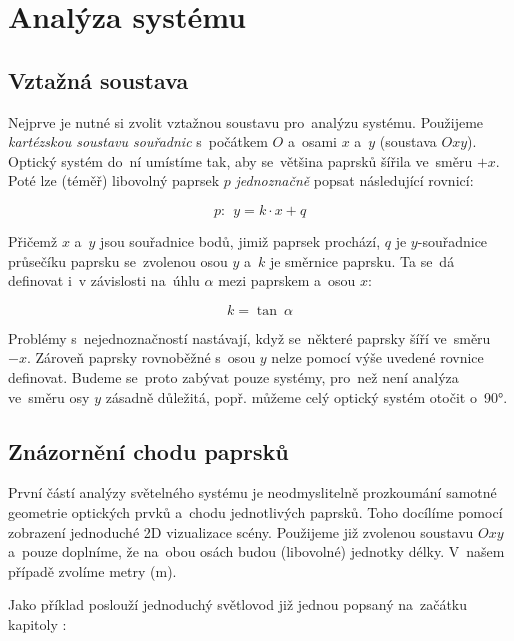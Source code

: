 \section{Analýza systému}
\label{sec:analyzasystemu}

\subsection{Vztažná soustava}

Nejprve je nutné si zvolit vztažnou soustavu pro~analýzu systému. Použijeme \emph{kartézskou soustavu souřadnic} s~počátkem $O$ a~osami $x$ a~$y$ (soustava $Oxy$). Optický systém do~ní umístíme tak, aby se~většina paprsků šířila ve~směru $+x$. Poté lze (téměř) libovolný paprsek $p$ \emph{jednoznačně} popsat následující rovnicí:

\[ p:\ \ y = k \cdot x + q \]

Přičemž $x$ a~$y$ jsou souřadnice bodů, jimiž paprsek prochází, $q$ je $y$-souřadnice průsečíku paprsku se~zvolenou osou $y$ a~$k$ je směrnice paprsku. Ta se~dá definovat i~v závislosti na~úhlu $\alpha$ mezi paprskem a~osou $x$:

\[ k = \tan\ \alpha \]

Problémy s~nejednoznačností nastávají, když se~některé paprsky šíří ve~směru $-x$. Zároveň paprsky rovnoběžné s~osou $y$ nelze pomocí výše uvedené rovnice definovat. Budeme se~proto zabývat pouze systémy, pro~než není analýza ve~směru osy $y$ zásadně důležitá, popř. můžeme celý optický systém otočit o~90°.


\subsection{Znázornění chodu paprsků}
První částí analýzy světelného systému je neodmyslitelně prozkoumání samotné geometrie optických prvků a~chodu jednotlivých paprsků. Toho docílíme pomocí zobrazení jednoduché 2D vizualizace scény. Použijeme již zvolenou soustavu $Oxy$ a~pouze doplníme, že na~obou osách budou (libovolné) jednotky délky. V~našem případě zvolíme metry ($\mathrm{m}$).

\beautypage

Jako příklad poslouží jednoduchý světlovod již jednou popsaný na~začátku kapitoly :



